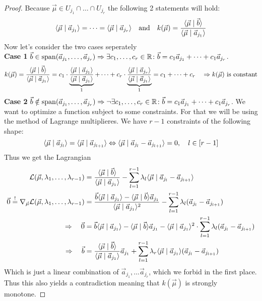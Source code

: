 \begin{proof}
    Because $\vec \mu \in U_{j_1}\cap \dots\cap U_{j_r}$ the following 2 statements will hold:
    $$\langle \vec{\mu} \mid \vec a_{j_1} \rangle = \dots = \langle \vec{\mu} \mid \vec a_{j_r} \rangle \quad\textrm{and}\quad k(\vec\mu) = \frac{\langle \vec \mu \mid \vec b \rangle}{\langle \vec \mu \mid \vec a_{j_1} \rangle}$$
    Now let's consider the two cases seperately\\
    \textbf{Case 1} $\vec b \in \operatorname{span}(\vec a_{j_1}, \dots, \vec a_{j_r}) \Rightarrow\exists c_1, \dots, c_r \in \mathbb{R}\colon \vec b = c_1\vec a_{j_1} + \dots + c_1\vec a_{j_r}$.
    $$k(\vec\mu) = \frac{\langle \vec \mu \mid \vec b \rangle}{\langle \vec \mu \mid \vec a_{j_1} \rangle} = c_1 \cdot \underbrace{\frac{\langle \vec \mu \mid \vec a_{j_1} \rangle}{\langle \vec \mu \mid \vec a_{j_1} \rangle}}_1 + \dots + c_r \cdot \underbrace{\frac{\langle \vec \mu \mid \vec a_{j_r} \rangle}{\langle \vec \mu \mid \vec a_{j_1} \rangle}}_1 = c_1 + \dots + c_r \quad \Rightarrow k(\vec\mu)\textrm{ is constant}$$
    \textbf{Case 2} $\vec b \notin \operatorname{span}(\vec a_{j_1}, \dots, \vec a_{j_r}) \Rightarrow\lnot\exists c_1, \dots, c_r \in \mathbb{R}\colon \vec b = c_1\vec a_{j_1} + \dots + c_1\vec a_{j_r}$. We want to optimize a function subject to some constraints. For that we will be using the method of Lagrange multiplieres. We have $r-1$ constraints of the following shape:
    $$\langle \vec\mu \mid \vec a_{j_l} \rangle = \langle \vec\mu \mid \vec a_{j_{l+1}} \rangle \Leftrightarrow \langle \vec\mu \mid \vec a_{j_l} - \vec a_{j_{l+1}} \rangle = 0, \quad l \in [r-1]$$
    Thus we get the Lagrangian
    \begin{align*}
        \mathcal{L}(\vec\mu, \lambda_1, \dots, \lambda_{r-1}) &= \frac{\langle \vec \mu \mid \vec b \rangle}{\langle \vec \mu \mid \vec a_{j_1} \rangle} - \sum_{l=1}^{r-1}\lambda_l \langle \vec\mu \mid \vec a_{j_l} - \vec a_{j_{l+1}} \rangle\\
        \vec0 \stackrel{!}{=}\nabla_{\vec \mu} \mathcal{L}(\vec\mu, \lambda_1, \dots, \lambda_{r-1}) &= \frac{\vec b\langle \vec\mu \mid \vec a_{j_{1}} \rangle - \langle \vec\mu \mid \vec b \rangle\vec a_{j_{1}}}{\langle \vec\mu \mid \vec a_{j_{1}} \rangle^2} - \sum_{l=1}^{r-1}\lambda_l(\vec a_{j_l} - \vec a_{j_{l+1}}) \\
        \Rightarrow\quad \vec0 &= \vec b\langle \vec\mu \mid \vec a_{j_{1}} \rangle - \langle \vec\mu \mid \vec b \rangle\vec a_{j_{1}} - \langle \vec\mu \mid \vec a_{j_{1}} \rangle^2\cdot\sum_{l=1}^{r-1}\lambda_l(\vec a_{j_l} - \vec a_{j_{l+1}})\\
        \Rightarrow\quad \vec b &= \frac{\langle \vec \mu \mid \vec b \rangle}{\langle \vec \mu \mid \vec a_{j_{1}} \rangle}\vec a_{j_{1}} + \sum_{l=1}^{r-1} \lambda_r \langle \vec\mu \mid \vec a_{j_{1}} \rangle(\vec a_{j_l} - \vec a_{j_{l+1}})
    \end{align*}
    Which is just a linear combination of $\vec a_{j_1}, \dots \vec a_{j_r}$, which we forbid in the first place. Thus this also yields a contradiction meaning that $k(\vec\mu)$ is strongly monotone.
\end{proof}

